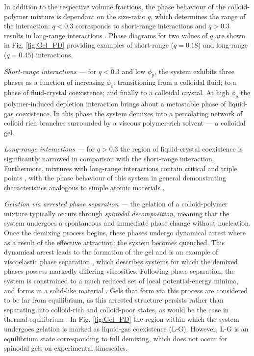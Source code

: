 In addition to the respective volume fractions, the phase behaviour of the colloid-polymer mixture is dependant on the size-ratio $q$, which determines the range of the interaction: $q<0.3$ corresponds to short-range interactions and $q>0.3$ results in long-range interactions \cite{gast1983}. Phase diagrams for two values of $q$ are shown in Fig. \ref{fig:Gel_PD} providing examples of short-range ($q = 0.18$) and long-range ($q = 0.45$) interactions.

\textit{Short-range interactions ---} for $q<0.3$ and low $\phi_p$, the system exhibits three phases as a function of increasing $\phi_c$: transitioning from a colloidal fluid; to a phase of fluid-crystal coexistence; and finally to a colloidal crystal. At high $\phi_p$ the polymer-induced depletion interaction brings about a metastable phase of liquid-gas coexistence.  In this phase the system demixes into a percolating network of colloid rich branches surrounded by a viscous polymer-rich solvent --- a colloidal gel.

\textit{Long-range interactions ---} for $q>0.3$ the region of liquid-crystal coexistence is significantly narrowed in comparison with the short-range interaction. Furthermore, mixtures with long-range interactions contain critical and triple points \cite{lekkerkerker1992}, with the phase behaviour of this system in general demonstrating characteristics analogous to simple atomic materials \cite{gast1983,vincent1988}. 

\textit{Gelation via arrested phase separation ---} the gelation of a colloid-polymer mixture typically occurs through \textit{spinodal decomposition}, meaning that the system undergoes a spontaneous and immediate phase change without nucleation. 
Once the demixing process begins, these phases undergo dynamical arrest where as a result of the effective attraction; the system becomes quenched. This dynamical arrest leads to the formation of the gel and is an example of viscoelastic phase separation \cite{tanaka2000}, which describes systems for which the demixed phases possess markedly differing viscosities.
Following phase separation, the system is constrained to a much reduced set of local potential-energy minima, and forms in a solid-like material \cite{royall2008,royall2021}. Gels that form via this process are considered to be far from equilibrium, as this arrested structure persists rather than separating into colloid-rich and colloid-poor states, as would be the case in thermal equilibrium \cite{poon2002}.
In Fig. \ref{fig:Gel_PD} the region within which the system undergoes gelation is marked as liquid-gas coexistence (L-G). However, L-G is an equilibrium state corresponding to full demixing, which does not occur for spinodal gels on experimental timescales. 


